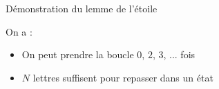 \begin{frame}{Démonstration du lemme de l'étoile}
  \pause

  \begin{center}\end{center}

  On a :
  \begin{itemize}
  \item On peut prendre la boucle $0$, $2$, $3$, ... fois
  \item $N$ lettres suffisent pour repasser dans un état
  \end{itemize}

  \phantom{.}
\end{frame}

\endgroup
\endinput
